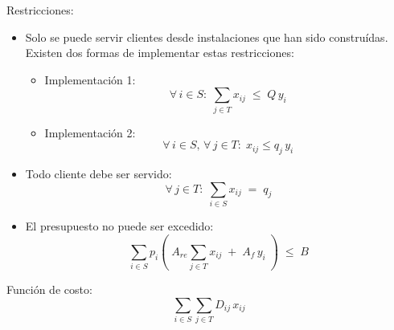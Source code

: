 \documentclass[ 10pt, xcolor = dvipsnames]{beamer}
\begin{document}
\begin{frame}[allowframebreaks]
\frametitle{\insertsection}

Restricciones: 
\begin{itemize}
\item Solo se puede servir clientes desde instalaciones que han sido constru\'idas. Existen dos formas de implementar estas restricciones: 
\begin{itemize}
\item Implementaci\'on 1: 
\[
\forall \, i \in S \colon \; \sum_{j \in T} x_{ij} \; \leq \; Q \, y_i
\]
\item Implementaci\'on 2:
\[
\forall \, i \in S, \, \forall \, j \in T \colon \;
x_{ij} \leq q_j \, y_i
\]
\end{itemize}
\item Todo cliente debe ser servido: 
\[
\forall \, j \in T \colon \; \sum_{i \in S} x_{ij} \; = \; q_j
\]
\item El presupuesto no puede ser excedido: 
\[
\sum_{i \in S} p_i \left( \; A_{re} \sum_{j \in T} x_{ij} \; + \; A_f \, y_i \; \right) \; \leq \; B
\]
\end{itemize}

Funci\'on de costo: 
\[
\sum_{i \in S} \sum_{j \in T} D_{ij} \, x_{ij}
\]

\end{frame}
\end{document}
